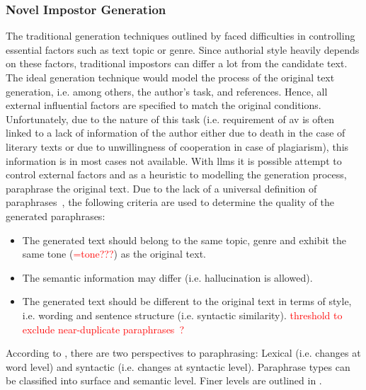 \subsubsection{Novel Impostor Generation}
\label{subsubsec:novel_impostor_generation}
The traditional generation techniques outlined by \citet{koppel_determining_2014} faced difficulties in controlling essential factors such as text topic or genre.
Since authorial style heavily depends on these factors, traditional impostors can differ a lot from the candidate text.
The ideal generation technique would model the process of the original text generation, 
i.e. among others, the author's task, and references.
Hence, all external influential factors are specified to match the original conditions.
Unfortunately, due to the nature of this task 
(i.e. requirement of \ac{av} is often linked to a lack of information of the author either due to death in the case of literary texts or 
due to unwillingness of cooperation in case of plagiarism), this information is in most cases not available.
With \acp{llm} it is possible attempt to control external factors and 
as a heuristic to modelling the generation process, paraphrase the original text.
Due to the lack of a universal definition of paraphrases~\citep{gohsen_task_oriented_2024}, the following criteria are used to determine the quality of the generated paraphrases:
\begin{itemize}
    \item The generated text should belong to the same topic, genre and exhibit the same tone (\textcolor{red}{=tone???}) as the original text.
    \item The semantic information may differ (i.e. hallucination is allowed).
    \item The generated text should be different to the original text in terms of style, i.e. wording and sentence structure (i.e. syntactic similarity). \textcolor{red}{threshold to exclude near-duplicate paraphrases~\citep{gohsen_captions_2023}?}
\end{itemize}


According to \citet{gohsen_task_oriented_2024}, there are two perspectives to paraphrasing: 
Lexical (i.e. changes at word level) and syntactic (i.e. changes at syntactic level).
Paraphrase types can be classified into surface and semantic level. Finer levels are outlined in \citep{gohsen_task_oriented_2024}.

